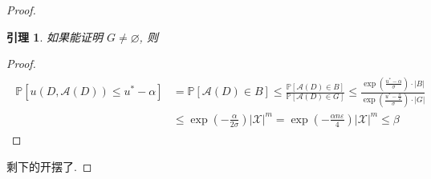 \documentclass[8pt]{article}
\theoremstyle{compact}
\newtheorem{lemma}{引理}[section]
\def\le{\leqslant}
\def\P#1{\mathbb{P}\left[{#1}\right]}
\begin{document}
\begin{proof}
	\begin{lemma}
		如果能证明 $G \neq \varnothing$, 则
	\end{lemma}
	\begin{proof}
		\begin{align*}
			\begin{split}
				\P{u(D, \mathcal A(D)) \le u^* - \alpha} &= \P{\mathcal A(D) \in B} \le \frac{\P{\mathcal A(D) \in B}}{\P{\mathcal A(D) \in G}} \le \frac{\exp\left(\frac{u^* - \alpha}{\sigma}\right)\cdot |B|}{\exp\left(\frac{u^* - \frac{\alpha}{2}}{\sigma}\right)\cdot |G|} \\&\le \exp\left(-\frac{\alpha}{2\sigma}\right)|\mathcal X|^m = \exp\left(-\frac{\alpha n \varepsilon}{4}\right)|\mathcal X|^m \le \beta
			\end{split}
		\end{align*}
	\end{proof}
	
	剩下的开摆了.
\end{proof}
\end{document}
